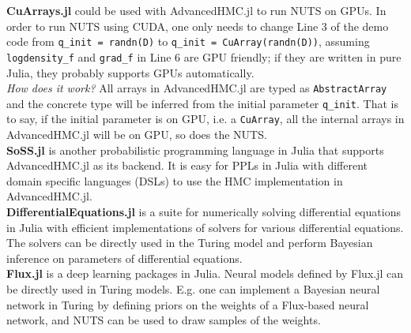 \documentclass[
    17pt,
    margin=1in,
    innermargin=-4.5in,
    blockverticalspace=-0.15in
]{tikzposter}
\begin{document}
\begin{columns}
{    \textbf{CuArrays.jl} could be used with AdvancedHMC.jl to run NUTS on GPUs.
    In order to run NUTS using CUDA, 
    one only needs to change Line 3 of the demo code 
    from \texttt{q\_init = randn(D)} to \texttt{q\_init = CuArray(randn(D))}, 
    assuming \texttt{logdensity\_f} and \texttt{grad\_f} in Line 6 are GPU friendly;
    if they are written in pure Julia, they probably supports GPUs automatically. \\
    \textit{How does it work?}
    All arrays in AdvancedHMC.jl are typed as \texttt{AbstractArray} and
    the concrete type will be inferred from the initial parameter \texttt{q\_init}.
    That is to say, if the initial parameter is on GPU, i.e. a \texttt{CuArray},
    all the internal arrays in AdvancedHMC.jl will be on GPU, so does the NUTS. \\

    \textbf{SoSS.jl} is another probabilistic programming language in Julia that
    supports AdvancedHMC.jl as its backend.
    It is easy for PPLs in Julia with different domain specific languages (DSLs)
    to use the HMC implementation in AdvancedHMC.jl. \\

    \textbf{DifferentialEquations.jl} is a suite for numerically solving differential equations in Julia 
    with efficient implementations of solvers for various differential equations.
    The solvers can be directly used in the Turing model and 
    perform Bayesian inference on parameters of differential equations. \\

    \textbf{Flux.jl} is a deep learning packages in Julia.
    Neural models defined by Flux.jl can be directly used in Turing models.
    E.g. one can implement a Bayesian neural network in Turing by 
    defining priors on the weights of a Flux-based neural network, and 
    NUTS can be used to draw samples of the weights.
}


    
\end{columns}
\end{document}

